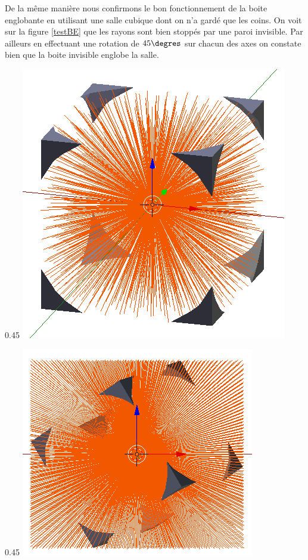 De la même manière nous confirmons le bon fonctionnement de la boite englobante en utilisant une salle cubique dont on n'a gardé que les coins. On voit sur la figure \ref{testBE} que les rayons sont bien stoppés par une paroi invisible. Par ailleurs en effectuant une rotation de $45\degres$ sur chacun des axes on constate bien que la boite invisible englobe la salle.
\begin{figureth}		
	\begin{subfigureth}{0.45\textwidth}
		\includegraphics[width=\linewidth]{images/testBE}
	\end{subfigureth}
	\quad
	\begin{subfigureth}{0.45\textwidth}
		\includegraphics[width=\linewidth]{images/testBEbis}

\end{subfigureth}
\end{figureth}
